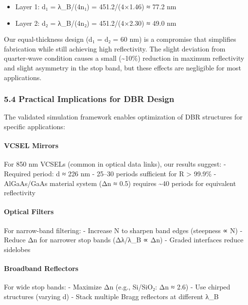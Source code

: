 \documentclass[
]{article}
\providecommand{\tightlist}{%
  \setlength{\itemsep}{0pt}\setlength{\parskip}{0pt}}
\begin{document}
\begin{itemize}
\tightlist
\item
  Layer 1: d₁ = λ\_B/(4n₁) = 451.2/(4×1.46) ≈ 77.2 nm
\item
  Layer 2: d₂ = λ\_B/(4n₂) = 451.2/(4×2.30) ≈ 49.0 nm
\end{itemize}

Our equal-thickness design (d₁ = d₂ = 60 nm) is a compromise that
simplifies fabrication while still achieving high reflectivity. The
slight deviation from quarter-wave condition causes a small
(\textasciitilde10\%) reduction in maximum reflectivity and slight
asymmetry in the stop band, but these effects are negligible for most
applications.

\subsubsection{5.4 Practical Implications for DBR
Design}\label{practical-implications-for-dbr-design}

The validated simulation framework enables optimization of DBR
structures for specific applications:

\paragraph{VCSEL Mirrors}\label{vcsel-mirrors}

For 850 nm VCSELs (common in optical data links), our results suggest: -
Required period: d ≈ 226 nm - 25--30 periods sufficient for R
\textgreater{} 99.9\% - AlGaAs/GaAs material system (Δn ≈ 0.5) requires
\textasciitilde40 periods for equivalent reflectivity

\paragraph{Optical Filters}\label{optical-filters}

For narrow-band filtering: - Increase N to sharpen band edges (steepness
∝ N) - Reduce Δn for narrower stop bands (Δλ/λ\_B ∝ Δn) - Graded
interfaces reduce sidelobes

\paragraph{Broadband Reflectors}\label{broadband-reflectors}

For wide stop bands: - Maximize Δn (e.g., Si/SiO₂: Δn ≈ 2.6) - Use
chirped structures (varying d) - Stack multiple Bragg reflectors at
different λ\_B
\end{document}
